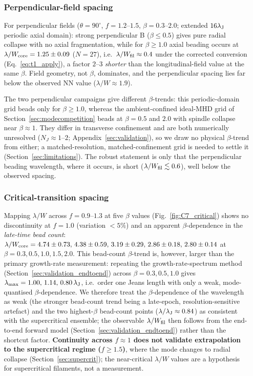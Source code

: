 \documentclass[usenatbib,twoside,twocolumn]{mnras}
\begin{document}
\subsubsection{Perpendicular-field spacing}

For perpendicular fields ($\theta=90^\circ$, $f=1.2$--$1.5$, $\beta=0.3$--$2.0$; extended $16\lambda_{\rm J}$ periodic axial domain): strong perpendicular B ($\beta\leq0.5$) gives pure radial collapse with no axial fragmentation, while for $\beta\geq1.0$ axial beading occurs at $\lambda/W_{\rm core}=1.25\pm0.09$ ($N=27$), i.e.\ $\lambda/W_{\rm fil}\approx0.4$ under the corrected conversion (Eq.~\ref{eq:t1_apply}), a factor $2$--$3$ \textit{shorter} than the longitudinal-field value at the same $\beta$. Field geometry, not $\beta$, dominates, and the perpendicular spacing lies far below the observed NN value ($\lambda/W\approx1.9$).

The two perpendicular campaigns give different $\beta$-trends: this periodic-domain grid beads only for $\beta\geq1.0$, whereas the ambient-confined ideal-MHD grid of Section~\ref{sec:modecompetition} beads at $\beta=0.5$ and $2.0$ with spindle collapse near $\beta\approx1$. They differ in transverse confinement and are both numerically unresolved ($N_J\approx1$--$2$; Appendix~\ref{sec:validation}), so we draw no physical $\beta$-trend from either; a matched-resolution, matched-confinement grid is needed to settle it (Section~\ref{sec:limitations}). The robust statement is only that the perpendicular beading wavelength, where it occurs, is short ($\lambda/W_{\rm fil}\lesssim0.6$), well below the observed spacing.

\subsubsection{Critical-transition spacing}

Mapping $\lambda/W$ across $f=0.9$--$1.3$ at five $\beta$ values (Fig.~\ref{fig:C7_critical}) shows no discontinuity at $f=1.0$ (variation $<5\%$) and an apparent $\beta$-dependence in the \emph{late-time bead count}: $\lambda/W_{\rm core} = 4.74\pm0.73,\,4.38\pm0.59,\,3.19\pm0.29,\,2.86\pm0.18,\,2.80\pm0.14$ at $\beta=0.3,0.5,1.0,1.5,2.0$. This bead-count $\beta$-trend is, however, larger than the primary growth-rate measurement: repeating the growth-rate-spectrum method (Section~\ref{sec:validation_endtoend}) across $\beta=0.3,0.5,1.0$ gives $\lambda_{\rm max}=1.00,\,1.14,\,0.80\,\lambda_{\rm J}$, i.e.\ order one Jeans length with only a weak, mode-quantised $\beta$-dependence. We therefore treat the $\beta$-dependence of the wavelength as weak (the stronger bead-count trend being a late-epoch, resolution-sensitive artefact) and the two highest-$\beta$ bead-count points ($\lambda/\lambda_{\rm J}\approx0.84$) as consistent with the supercritical ensemble; the observable $\lambda/W_{\rm fil}$ then follows from the end-to-end forward model (Section~\ref{sec:validation_endtoend}) rather than the shortcut factor. \textbf{Continuity across $f\approx1$ does not validate extrapolation to the supercritical regime ($f\geq1.5$)}, where the mode changes to radial collapse (Section~\ref{sec:supercrit}); the near-critical $\lambda/W$ values are a hypothesis for supercritical filaments, not a measurement.
\end{document}
